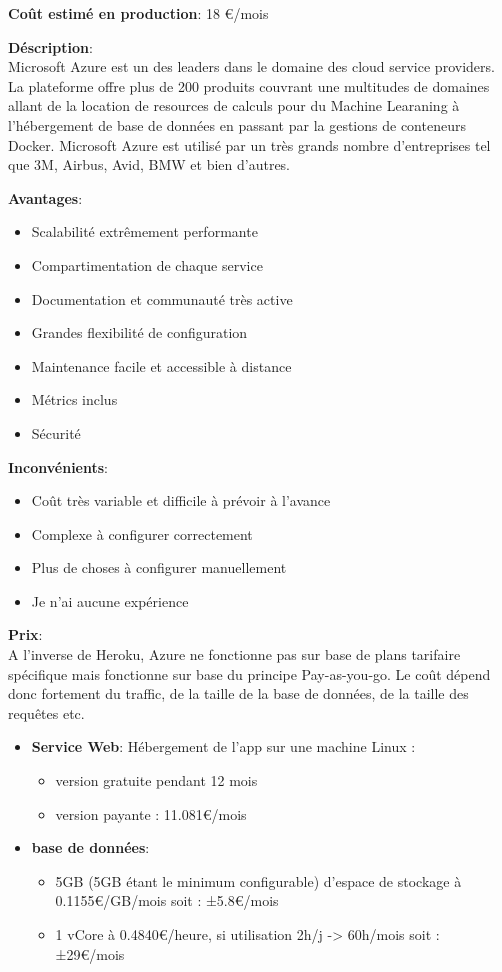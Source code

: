 \newpara
\textbf{Coût estimé en production}: 18 €/mois

\newpage
{}

\textbf{Déscription}: \\ Microsoft Azure est un des leaders dans le domaine des cloud service providers. La plateforme offre plus de 200 produits couvrant une multitudes de domaines allant de la location de resources de calculs pour du Machine Learaning à l'hébergement de base de données en passant par la gestions de conteneurs Docker.
\newpara
Microsoft Azure est utilisé par un très grands nombre d'entreprises tel que 3M, Airbus, Avid, BMW et bien d'autres.

\newpara
\textbf{Avantages}:
\begin{itemize}
  \item Scalabilité extrêmement performante
  \item Compartimentation de chaque service
  \item Documentation et communauté très active
  \item Grandes flexibilité de configuration
  \item Maintenance facile et accessible à distance
  \item Métrics inclus
  \item Sécurité
\end{itemize}

\newpara
\textbf{Inconvénients}:
\begin{itemize}
  \item Coût très variable et difficile à prévoir à l'avance
  \item Complexe à configurer correctement
  \item Plus de choses à configurer manuellement
  \item Je n'ai aucune expérience
\end{itemize}

\newpara
\textbf{Prix}: \\ A l'inverse de Heroku, Azure ne fonctionne pas sur base de plans tarifaire spécifique mais fonctionne sur base du principe Pay-as-you-go. Le coût dépend donc fortement du traffic, de la taille de la base de données, de la taille des requêtes etc.

\begin{itemize}
  \item \textbf{Service Web}: Hébergement de l'app sur une machine Linux :
  \begin{itemize}
    \item version gratuite pendant 12 mois
    \item version payante : 11.081€/mois
  \end{itemize}
  \item \textbf{base de données}:
  \begin{itemize}
    \item 5GB (5GB étant le minimum configurable) d'espace de stockage à 0.1155€/GB/mois soit : ±5.8€/mois
    \item 1 vCore à 0.4840€/heure, si utilisation 2h/j -> 60h/mois soit : ±29€/mois
  \end{itemize}
\end{itemize}

